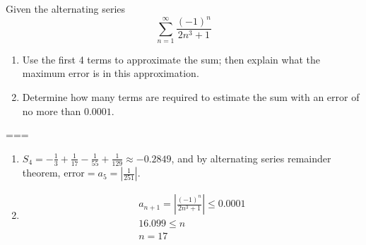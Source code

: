 Given the alternating series
\[\sum_{n=1}^\infty\frac{{(-1)}^n}{2n^3+1}\]
\begin{enumerate}
  \item Use the first 4 terms to approximate the sum; then explain what the
    maximum error is in this approximation.
  \item Determine how many terms are required to estimate the sum with an error
    of no more than \(0.0001\).
\end{enumerate}
===
\begin{enumerate}
  \item \(S_4=-\frac{1}{3}+\frac{1}{17}-\frac{1}{55}+\frac{1}{129}\approx
    -0.2849\), and by alternating series remainder theorem,
    \(\text{error}=a_5=\left|\frac{1}{251}\right|\).
  \item
    \begin{gather*}
      a_{n+1}=\left|\frac{{(-1)}^n}{2n^3+1}\right|\leq 0.0001\\
      16.099\leq n\\
      n=17
    \end{gather*}

\end{enumerate}
